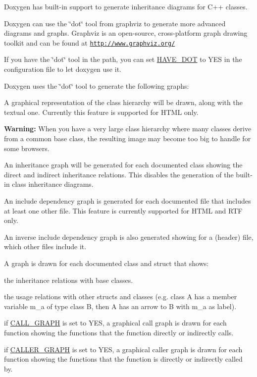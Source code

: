 Doxygen has built-\/in support to generate inheritance diagrams for C++ classes.

Doxygen can use the \char`\"{}dot\char`\"{} tool from graphviz to generate more advanced diagrams and graphs. Graphviz is an open-\/source, cross-\/platform graph drawing toolkit and can be found at \href{http://www.graphviz.org/}{\tt http://www.graphviz.org/}

If you have the \char`\"{}dot\char`\"{} tool in the path, you can set \hyperlink{config_cfg_have_dot}{HAVE\_\-DOT} to {\ttfamily YES} in the configuration file to let doxygen use it.

Doxygen uses the \char`\"{}dot\char`\"{} tool to generate the following graphs: 
\begin{DoxyItemize}
\item A graphical representation of the class hierarchy will be drawn, along with the textual one. Currently this feature is supported for HTML only.\par
 {\bfseries Warning:} When you have a very large class hierarchy where many classes derive from a common base class, the resulting image may become too big to handle for some browsers. 
\item An inheritance graph will be generated for each documented class showing the direct and indirect inheritance relations. This disables the generation of the built-\/in class inheritance diagrams. 
\item An include dependency graph is generated for each documented file that includes at least one other file. This feature is currently supported for HTML and RTF only. 
\item An inverse include dependency graph is also generated showing for a (header) file, which other files include it. 
\item A graph is drawn for each documented class and struct that shows: 
\begin{DoxyItemize}
\item the inheritance relations with base classes. 
\item the usage relations with other structs and classes (e.g. class {\ttfamily A} has a member variable {\ttfamily m\_\-a} of type class {\ttfamily B}, then {\ttfamily A} has an arrow to {\ttfamily B} with {\ttfamily m\_\-a} as label). 
\end{DoxyItemize}
\item if \hyperlink{config_cfg_call_graph}{CALL\_\-GRAPH} is set to YES, a graphical call graph is drawn for each function showing the functions that the function directly or indirectly calls. 
\item if \hyperlink{config_cfg_caller_graph}{CALLER\_\-GRAPH} is set to YES, a graphical caller graph is drawn for each function showing the functions that the function is directly or indirectly called by. 
\end{DoxyItemize}

